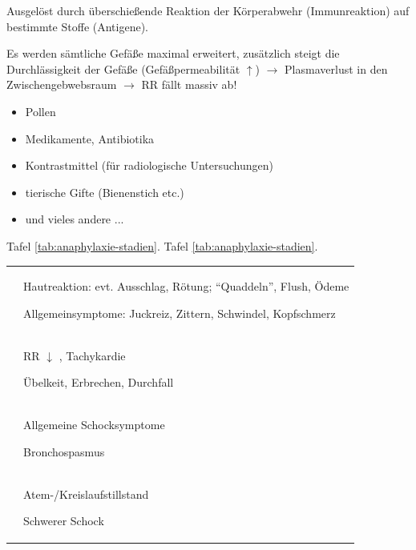 

 Ausgelöst durch überschießende Reaktion der Körperabwehr (Immunreaktion) auf
bestimmte Stoffe (Antigene). 


Es werden sämtliche Gefäße maximal erweitert, zusätzlich
steigt die Durchlässigkeit der Gefäße
(Gefäßpermeabilität ${\uparrow}$) ${\rightarrow}$ 
Plasmaverlust in den Zwischengebwebsraum 
${\rightarrow}$ RR fällt massiv ab!



{
\begin{itemize}
    \item Pollen
    \item Medikamente, Antibiotika
    \item Kontrastmittel (für radiologische Untersuchungen)
    \item tierische Gifte (Bienenstich etc.)
    \item und vieles andere ...
\end{itemize}
}{}{}{}{}


\MarriedNG{\TxSymptome}
{
Tafel \ref{tab:anaphylaxie-stadien}.
}
{
Tafel \ref{tab:anaphylaxie-stadien}.
}


\begin{table}[H]
\begin{tabulary}{\linewidth}[H]{cL}
 &
\\\toprule
{}
 &
Hautreaktion: evt. Ausschlag, Rötung;
"`Quaddeln"', Flush, Ödeme

Allgemeinsymptome: Juckreiz, Zittern, Schwindel, Kopfschmerz

\\\addlinespace
{}

 &
RR ${\downarrow}$  , Tachykardie

Übelkeit, Erbrechen, Durchfall 

\\\addlinespace
{}
 &
Allgemeine Schocksymptome

Bronchospasmus
\\\addlinespace
{}
 &
Atem-/Kreislaufstillstand

Schwerer Schock
\\\bottomrule
\end{tabulary}
\end{table}

